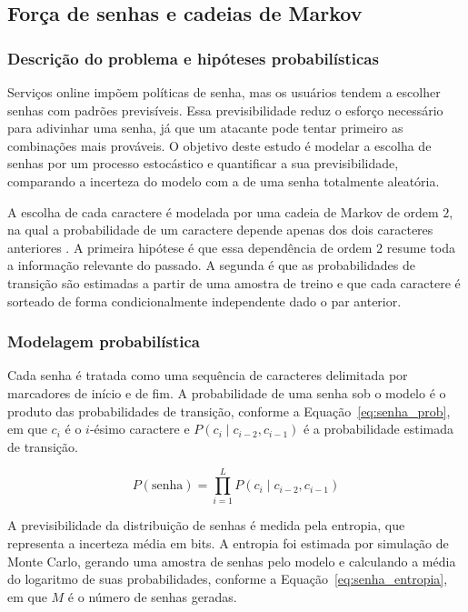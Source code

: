 \subsection{Força de senhas e cadeias de Markov}

\subsubsection{Descrição do problema e hipóteses probabilísticas}

Serviços online impõem políticas de senha, mas os usuários tendem a escolher senhas
com padrões previsíveis. Essa previsibilidade reduz o esforço necessário para
adivinhar uma senha, já que um atacante pode tentar primeiro as combinações mais
prováveis. O objetivo deste estudo é modelar a escolha de senhas por um processo
estocástico e quantificar a sua previsibilidade, comparando a incerteza do modelo
com a de uma senha totalmente aleatória.

A escolha de cada caractere é modelada por uma cadeia de Markov de ordem $2$, na qual
a probabilidade de um caractere depende apenas dos dois caracteres anteriores
\cite{ross2024models}. A primeira hipótese é que essa dependência de ordem $2$ resume
toda a informação relevante do passado. A segunda é que as probabilidades de
transição são estimadas a partir de uma amostra de treino e que cada caractere é
sorteado de forma condicionalmente independente dado o par anterior.

\subsubsection{Modelagem probabilística}

Cada senha é tratada como uma sequência de caracteres delimitada por marcadores de
início e de fim. A probabilidade de uma senha sob o modelo é o produto das
probabilidades de transição, conforme a Equação~\ref{eq:senha_prob}, em que $c_i$ é
o $i$-ésimo caractere e $P(c_i \mid c_{i-2}, c_{i-1})$ é a probabilidade estimada de
transição.

\begin{equation}
	P(\text{senha}) = \prod_{i=1}^{L} P(c_i \mid c_{i-2}, c_{i-1})
	\label{eq:senha_prob}
\end{equation}

A previsibilidade da distribuição de senhas é medida pela entropia, que representa a
incerteza média em bits. A entropia foi estimada por simulação de Monte Carlo,
gerando uma amostra de senhas pelo modelo e calculando a média do logaritmo de suas
probabilidades, conforme a Equação~\ref{eq:senha_entropia}, em que $M$ é o número de
senhas geradas.

